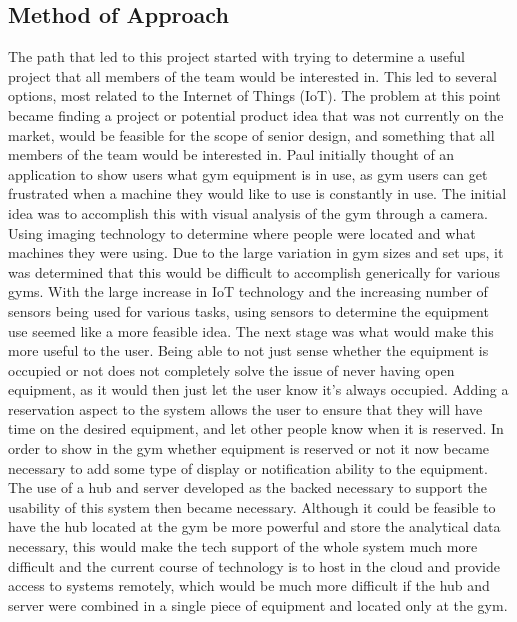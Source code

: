 \documentclass[PPFS.tex]{template/subfiles}
\begin{document}
	\subsection{Method of Approach}
	The path that led to this project started with trying to determine a useful project that all members of the team would be interested in. This led to several options, most related to the Internet of Things (IoT). The problem at this point became finding a project or potential product idea that was not currently on the market, would be feasible for the scope of senior design, and something that all members of the team would be interested in. Paul initially thought of an application to show users what gym equipment is in use, as gym users can get frustrated when a machine they would like to use is constantly in use. The initial idea was to accomplish this with visual analysis of the gym through a camera. Using imaging technology to determine where people were located and what machines they were using. Due to the large variation in gym sizes and set ups, it was determined that this would be difficult to accomplish generically for various gyms. With the large increase in IoT technology and the increasing number of sensors being used for various tasks, using sensors to determine the equipment use seemed like a more feasible idea. The next stage was what would make this more useful to the user. Being able to not just sense whether the equipment is occupied or not does not completely solve the issue of never having open equipment, as it would then just let the user know it's always occupied. Adding a reservation aspect to the system allows the user to ensure that they will have time on the desired equipment, and let other people know when it is reserved. In order to show in the gym whether equipment is reserved or not it now became necessary to add some type of display or notification ability to the equipment. The use of a hub and server developed as the backed necessary to support the usability of this system then became necessary. Although it could be feasible to have the hub located at the gym be more powerful and store the analytical data necessary, this would make the tech support of the whole system much more difficult and the current course of technology is to host in the cloud and provide access to systems remotely, which would be much more difficult if the hub and server were combined in a single piece of equipment and located only at the gym. 
	
\end{document}
